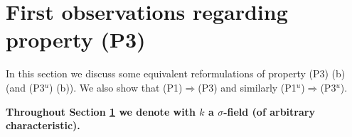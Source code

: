 \documentclass[oneside,reqno]{amsart}
\newtheorem{lemma}[theo]{Lemma}
\theoremstyle{definition}
\newcommand{\s}{\sigma}
\newcommand{\pis}{\pi_0^\sigma}
\newcommand{\ks}{$k$\=/$\s$}
\newcommand{\po}{{\rm{(P1$^u$)}}}
\newcommand{\pt}{{\rm{(P3$^u$)}}}
\newcommand{\poweak}{{\rm{(P1)}}}
\newcommand{\ptweak}{{\rm{(P3)}}}
\begin{document}



\section{First observations regarding property \ptweak{}}
\label{sec: first observations}

In this section we discuss some equivalent reformulations of property \ptweak{} (b) (and \pt{} (b)). We also show that \poweak{}$\Rightarrow$\ptweak{} and similarly \po{}$\Rightarrow$\pt{}. 

\medskip

{\bf Throughout Section \ref{sec: first observations} we denote with $k$ a $\s$-field (of arbitrary characteristic).}

\medskip
%
%



%
\end{document}
